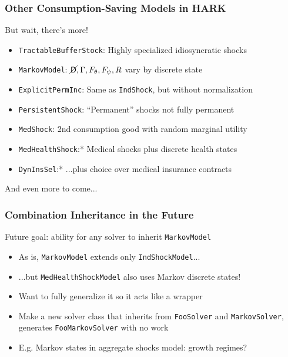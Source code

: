\documentclass[11pt]{cfpbpresentation}
\newcommand{\Die}{\mathsf{D}}
\newcommand{\Live}{\cancel{\Die}}
\begin{document}
\begin{frame}
\frametitle{Other Consumption-Saving Models in HARK}
\begin{block}{But wait, there's more!}
\begin{itemize}
\item <1->\texttt{TractableBufferStock}: Highly specialized idiosyncratic shocks

\item <2->\texttt{MarkovModel}: $\Live,\Gamma,F_\theta,F_\psi,R$ vary by discrete state

\item <3->\texttt{ExplicitPermInc}: Same as \texttt{IndShock}, but without normalization

\item <3->\texttt{PersistentShock}: ``Permanent'' shocks not fully permanent

\item <4->\texttt{MedShock}: 2nd consumption good with random marginal utility

\item <5->\texttt{MedHealthShock}:* Medical shocks plus discrete health states

\item <5->\texttt{DynInsSel}:* ...plus choice over medical insurance contracts
\end{itemize}
\end{block}

\begin{block}{And even more to come...}\end{block}
\end{frame}

\begin{frame}
\frametitle{Combination Inheritance in the Future}
Future goal: ability for any solver to inherit \texttt{MarkovModel}
\begin{itemize}
\item <1->As is, \texttt{MarkovModel} extends only \texttt{IndShockModel}...

\item <1->...but \texttt{MedHealthShockModel} also uses Markov discrete states!

\item <2->Want to fully generalize it so it acts like a wrapper

\item <2->Make a new solver class that inherits from \texttt{FooSolver} and \texttt{MarkovSolver}, generates \texttt{FooMarkovSolver} with no work

\item <3->E.g. Markov states in aggregate shocks model: growth regimes?
\end{itemize}
\end{frame}
\end{document}
